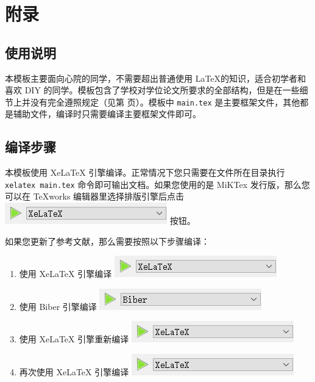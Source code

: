 \chapter{附录}

\section{使用说明}

本模板主要面向心院的同学，不需要超出普通使用 \LaTeX 的知识，适合初学者和喜欢 DIY 的同学。模板包含了学校对学位论文所要求的全部结构，但是在一些细节上并没有完全遵照规定（见第 \pageref{后记} 页）。模板中 \texttt{main.tex} 是主要框架文件，其他都是辅助文件，编译时只需要编译主要框架文件即可。

\section{编译步骤}

本模板使用 XeLaTeX 引擎编译。正常情况下您只需要在文件所在目录执行 \verb`xelatex main.tex` 命令即可输出文档。如果您使用的是 MiKTex 发行版，那么您可以在 TeXworks 编辑器里选择排版引擎后点击 \includegraphics{Pictures/Appendix/pic_xelatx.png} 按钮。

如果您更新了参考文献，那么需要按照以下步骤编译：

\begin{enumerate}
    \item 使用 XeLaTeX 引擎编译 \includegraphics{Pictures/Appendix/pic_xelatx.png}
    \item 使用 Biber 引擎编译 \includegraphics{Pictures/Appendix/pic_biber.png}
    \item 使用 XeLaTeX 引擎重新编译 \includegraphics{Pictures/Appendix/pic_xelatx.png}
    \item 再次使用 XeLaTeX 引擎编译 \includegraphics{Pictures/Appendix/pic_xelatx.png}
\end{enumerate}

